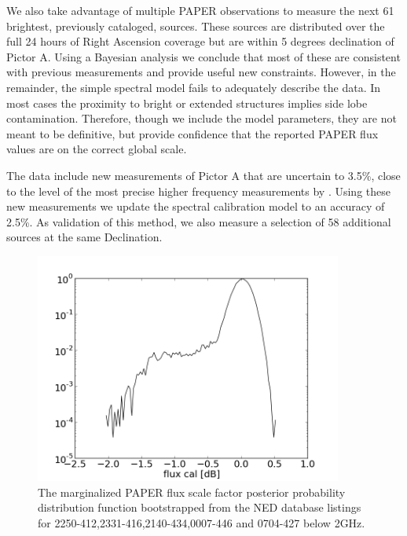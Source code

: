 \documentclass[preprint]{aastex}
\begin{document}
We also take advantage of multiple PAPER observations to measure the next  61
brightest, previously cataloged, sources. These sources are distributed over
the full 24 hours of Right Ascension coverage but are within 5 degrees
declination of Pictor A.  Using a Bayesian analysis we conclude that most of
these are consistent with previous measurements and provide useful new
constraints. However, in the remainder, the simple spectral model fails to
adequately describe the data. In most cases the proximity to bright or extended
structures implies side lobe contamination.  Therefore, though we include the
model parameters, they are not meant to be definitive, but provide confidence
that the reported PAPER flux values are on the correct global scale.

The data  include new measurements of Pictor A that are uncertain to 3.5\%,
close to the level of the most precise higher frequency measurements by
\citet{Wills:1975p9314}. Using these new measurements we update the spectral
calibration model to an accuracy of 2.5\%. As validation of this method, we
also measure a selection of 58 additional sources at the same Declination.  


\begin{figure}
\centering
\includegraphics[width=0.9\textwidth]{plots/2250-412_2331-416_2140-434_0007-446_0704-427_gain_mcmc_chain_gain_conf.png}
\caption{
The marginalized PAPER flux scale factor posterior probability distribution
function bootstrapped from the NED database listings for
2250-412,2331-416,2140-434,0007-446 and 0704-427 below 2GHz.
\label{fig:gain}}
\end{figure}
\end{document}
